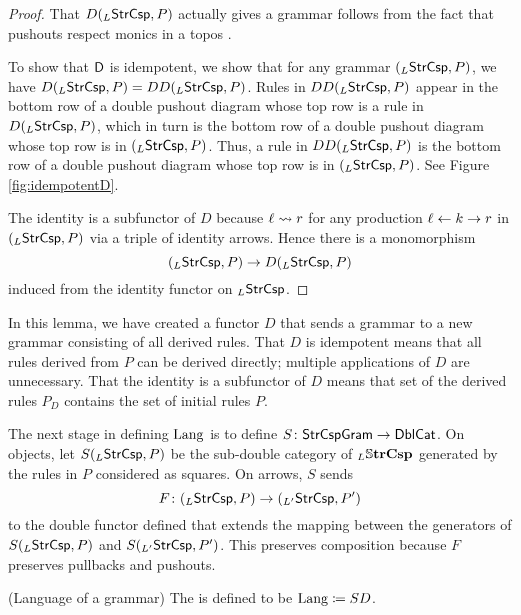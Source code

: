 \documentclass{amsart}
\begin{document}
\begin{proof}
  That $ D ( _{L}\mathsf{StrCsp} , P ) $ actually gives a grammar
  follows from the fact that pushouts respect monics in a
  topos \cite[Lem.~12]{LackSobo_Adhesive}.
  
  To show that $ \mathsf{D} $ is idempotent, we show that for any
  grammar $ ( _{L}\mathsf{StrCsp} , P ) $, we have
  $ D ( _{L}\mathsf{StrCsp} , P ) = DD ( _{L}\mathsf{StrCsp} , P ) $.  Rules
  in $ DD ( _{L}\mathsf{StrCsp} , P ) $ appear in the bottom row of a
  double pushout diagram whose top row is a rule in
  $ D ( _{L}\mathsf{StrCsp} , P ) $, which in turn is the bottom row
  of a double pushout diagram whose top row is in
  $ ( _{L}\mathsf{StrCsp} , P ) $. Thus, a rule in
  $ DD ( _{L}\mathsf{StrCsp} , P ) $ is the bottom row of a double
  pushout diagram whose top row is in
  $ ( _{L}\mathsf{StrCsp} , P ) $. See Figure \ref{fig:idempotentD}.

  

  The identity is a subfunctor of $ D $ because
  $ \ell \rightsquigarrow r $ for any production
  $ \ell \leftarrow k \to r $ in $ ( _{L}\mathsf{StrCsp} , P ) $ via a
  triple of identity arrows. Hence there is a monomorphism
  \[
    ( _L \mathsf{StrCsp} , P ) \to
    D ( _L \mathsf{StrCsp} , P )
  \]
  induced from the identity functor on $ _L\mathsf{StrCsp} $.
\end{proof}

In this lemma, we have created a functor $ D $ that sends a
grammar to a new grammar consisting of
all derived rules.  That $ D $ is idempotent means that all
rules derived from $ P $ can be derived directly; multiple
applications of $ D $ are unnecessary.  That the identity is
a subfunctor of $ D $ means that set of the derived rules
$ P_D $ contains the set of initial rules $ P $.

The next stage in defining $ \mathrm{Lang} $ is to define
$ S \colon \mathsf{StrCspGram} \to \mathsf{DblCat} $. On objects, let
$ S ( _L \mathsf{StrCsp} , P ) $ be the sub-double category of
$ _L \mathbb{S} \mathbf{trCsp} $ generated by the rules in $ P $ considered
as squares.  On arrows, $ S $ sends
\[
  F \colon ( _{L}\mathsf{StrCsp} , P ) \to ( _{L'} \mathsf{StrCsp} , P' )
\]
to the double functor defined that extends the mapping
between the generators of $ S ( _{L}\mathsf{StrCsp} , P ) $ and
$ S ( _{L'}\mathsf{StrCsp} , P' ) $.  This preserves composition because
$ F $ preserves pullbacks and pushouts. 

\begin{definition}(Language of a grammar)
  The  is defined to be
  $ \mathrm{Lang} \coloneqq SD $. 
\end{definition}
\end{document}
